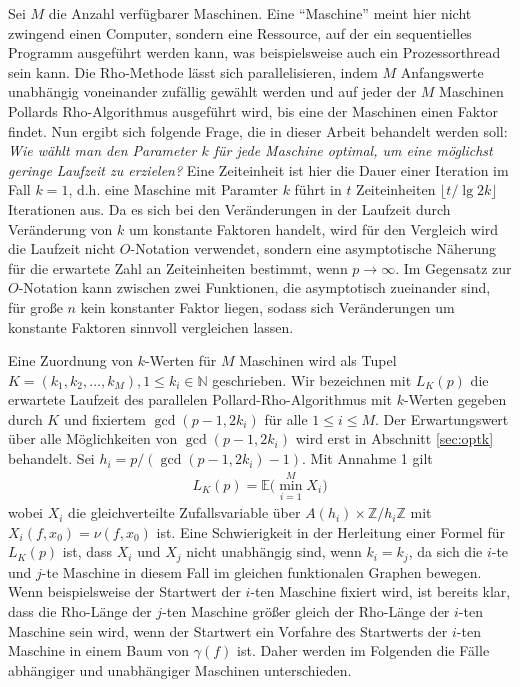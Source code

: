 \documentclass[a4paper, 10pt, ngerman]{article}
\newcommand{\E}{\mathbb{E}}
\newcommand{\N}{\mathbb{N}}
\newcommand{\Z}{\mathbb{Z}}
\begin{document}
Sei $M$ die Anzahl verfügbarer Maschinen. Eine "`Maschine"'  meint hier nicht zwingend einen Computer, sondern eine Ressource, auf der ein sequentielles Programm ausgeführt werden kann, was beispielsweise auch ein Prozessorthread sein kann. Die Rho-Methode lässt sich parallelisieren, indem $M$ Anfangswerte unabhängig voneinander zufällig gewählt werden und auf jeder der $M$ Maschinen Pollards Rho-Algorithmus ausgeführt wird, bis eine der Maschinen einen Faktor findet. Nun ergibt sich folgende Frage, die in dieser Arbeit behandelt werden soll: \emph{Wie wählt man den Parameter $k$ für jede Maschine optimal, um eine möglichst geringe Laufzeit zu erzielen?} Eine Zeiteinheit ist hier die Dauer einer Iteration im Fall $k = 1$, d.h. eine Maschine mit Paramter $k$ führt in $t$ Zeiteinheiten $\lfloor t / \lg 2k \rfloor$ Iterationen aus. Da es sich bei den Veränderungen in der Laufzeit durch Veränderung von $k$ um konstante Faktoren handelt, wird für den Vergleich wird die Laufzeit nicht $O$-Notation verwendet, sondern eine asymptotische Näherung für die erwartete Zahl an Zeiteinheiten bestimmt, wenn $p \to \infty$. Im Gegensatz zur $O$-Notation kann zwischen zwei Funktionen, die asymptotisch zueinander sind, für große $n$ kein konstanter Faktor liegen, sodass sich Veränderungen um konstante Faktoren sinnvoll vergleichen lassen.

Eine Zuordnung von $k$-Werten für $M$ Maschinen wird als Tupel $K = (k_1, k_2, \dots, k_M), 1 \le k_i \in \N$ geschrieben.  Wir bezeichnen mit $L_K(p)$ die erwartete Laufzeit des parallelen Pollard-Rho-Algorithmus mit $k$-Werten gegeben durch $K$ und fixiertem $\gcd(p - 1, 2k_i)$ für alle $1 \le i \le M$. Der Erwartungswert über alle Möglichkeiten von $\gcd(p - 1, 2k_i)$ wird erst in Abschnitt \ref{sec:optk} behandelt. Sei $h_i = p/(\gcd(p - 1, 2k_i) - 1)$. Mit Annahme 1 gilt
\begin{align*}
    L_K(p) = \E \bigg ( \min_{i = 1}^M X_i \bigg )
\end{align*}
wobei $X_i$ die gleichverteilte Zufallsvariable über $A(h_i) \times \Z/h_i\Z$ mit $X_i(f, x_0) = \nu(f, x_0)$ ist. Eine Schwierigkeit in der Herleitung einer Formel für $L_K(p)$ ist, dass $X_i$ und $X_j$ nicht unabhängig sind, wenn $k_i = k_j$, da sich die $i$-te und $j$-te Maschine in diesem Fall im gleichen funktionalen Graphen bewegen. Wenn beispielsweise der Startwert der $i$-ten Maschine fixiert wird, ist bereits klar, dass die Rho-Länge der $j$-ten Maschine größer gleich der Rho-Länge der $i$-ten Maschine sein wird, wenn der Startwert ein Vorfahre des Startwerts der $i$-ten Maschine in einem Baum von $\gamma(f)$ ist. Daher werden im Folgenden die Fälle abhängiger und unabhängiger Maschinen unterschieden.
\end{document}
